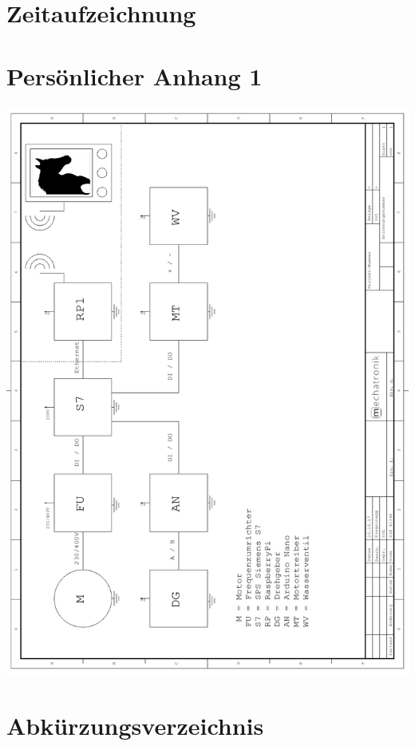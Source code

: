 \renewcommand\appendixname{Anhang}
\renewcommand\appendixpagename{Anhang}
\renewcommand\appendixtocname{Anhang}

\lohead{}

\appendix
\begingroup
\makeatletter
\let\ps@plain\ps@empty
\appendixpage
\makeatother
\endgroup

\chapter{Zeitaufzeichnung}
\chapter{Persönlicher Anhang 1}

\includegraphics[scale=0.86]{fig/Blockschaltbild1}

\markboth{}{}	%




\chapter{Abkürzungsverzeichnis}
\begin{acronym}
\end{acronym}

\listoffigures
\listoftables
\lstlistoflistings